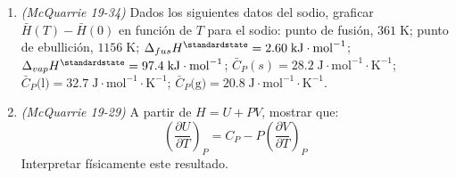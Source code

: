 \documentclass[a4paper,12pt]{article}
\begin{document}
\begin{enumerate}
 \item \textit{(McQuarrie 19-34)} Dados los siguientes datos del sodio, graficar $\bar{H}(T)-\bar{H}(0)$ en funci\'on de $T$ para el sodio: punto de fusi\'on, $361\;\mbox{K}$; punto de ebullici\'on, $1156\;\mbox{K}$; $\Delta_{fus}H^\standardstate=2.60\;\mbox{kJ}\cdot\mbox{mol}^{-1}$; $\Delta_{vap}H^\standardstate=97.4\;\mbox{kJ}\cdot\mbox{mol}^{-1}$; $\bar{C}_P(s)=28.2\;\mbox{J}\cdot\mbox{mol}^{-1}\cdot\mbox{K}^{-1}$; $\bar{C}_P\mbox{(l)}=32.7\;\mbox{J}\cdot\mbox{mol}^{-1}\cdot\mbox{K}^{-1}$; $\bar{C}_P\mbox{(g)}=20.8\;\mbox{J}\cdot\mbox{mol}^{-1}\cdot\mbox{K}^{-1}$. %

 \item \textit{(McQuarrie 19-29)} A partir de $H=U+PV$, mostrar que:
$$\left(\frac{\partial U}{\partial T}\right)_P=C_P-P\left(\frac{\partial V}{\partial T}\right)_P$$
Interpretar f\'isicamente este resultado. %

\end{enumerate}
 
\end{document}
